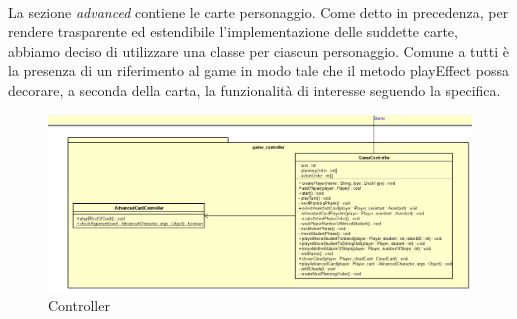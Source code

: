 \documentclass[a4paper, 12pt]{article}
\begin{document}
	\paragraph{}
	La sezione \emph{advanced} contiene le carte personaggio. Come detto in precedenza, per rendere trasparente ed estendibile l'implementazione delle suddette carte, abbiamo deciso di utilizzare una classe per ciascun personaggio. Comune a tutti è la presenza di un riferimento al game in modo tale che il metodo playEffect possa decorare, a seconda della carta, la funzionalità di interesse seguendo la specifica.
	
	\newpage
	\begin{figure}[h!]
		\centering
		\includegraphics[scale=0.5]{controller.png}
		\caption{Controller}
	\end{figure}
\end{document}
